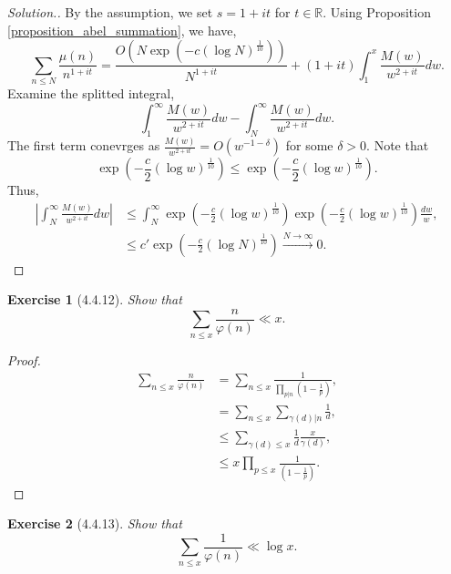 \documentclass{article}
\newtheorem{exercise}{Exercise}[section]
\newcommand{\R}[0]{\mathbb{R}}
\begin{document}
\begin{proof}[Solution.]
  By the assumption, we set $s = 1+it$ for $t\in\R$. Using Proposition \ref{proposition_abel_summation}, we have,
  \begin{equation*}
    \sum_{n\leq N}{\frac {\mu(n)} {n^{1+it}}} = {\frac {O(N\exp(-c(\log N)^{{\frac 1 {10}}}))} {N^{1+it}}}+(1+it)\int_1^x {\frac {M(w)} {w^{2+it}}}dw.
  \end{equation*}
  Examine the splitted integral,
  \begin{equation*}
    \int_1^\infty {\frac {M(w)} {w^{2+it}}}dw-\int_N^\infty {\frac {M(w)} {w^{2+it}}}dw.
  \end{equation*}
  The first term conevrges as ${\frac {M(w)} {w^{2+it}}}=O(w^{-1-\delta})$ for some $\delta>0$. Note that 
  \begin{equation*}
    \exp\left(-{\frac c 2}(\log w)^{{\frac 1 {10}}}\right)\leq \exp\left(-{\frac c 2}(\log w)^{{\frac 1 {10}}}\right).
  \end{equation*}
  Thus,
  \begin{align*}
    \left\vert\int_N^\infty {\frac {M(w)} {w^{2+it}}}dw\right\vert & \leq \int_N^\infty\exp\left(-{\frac c 2}(\log w)^{{\frac 1 {10}}}\right)\exp\left(-{\frac c 2}(\log w)^{{\frac 1 {10}}}\right){\frac {dw} w},\\
    & \leq c'\exp\left(-{\frac c 2}(\log N)^{{\frac 1 {10}}}\right)\stackrel{N\to\infty}{\to}0.
  \end{align*}
\end{proof}
\begin{exercise}[4.4.12]
  Show that 
  \begin{equation*}
    \sum_{n\leq x}{\frac n {\varphi(n)}}\ll x.
  \end{equation*}
\end{exercise}
\begin{proof}
  \begin{align*}
    \sum_{n\leq x}{\frac n {\varphi(n)}} & = \sum_{n\leq x}{\frac 1 {\prod_{p|n}\left(1-{\frac 1 p}\right)}},\\
    & = \sum_{n\leq x}\sum_{\gamma(d)|n}{\frac 1 d},\\
    & \leq \sum_{\gamma(d)\leq x}{\frac 1 d}{\frac {x} {\gamma(d)}},\\
    & \leq x\prod_{p\leq x}{\frac 1 {\left(1-{\frac 1 p}\right)}}.
  \end{align*}
\end{proof}
\begin{exercise}[4.4.13]
  \label{exercise_4.4.13}
  Show that 
  \begin{equation*}
    \sum_{n\leq x}{\frac 1 {\varphi(n)}}\ll \log x.
  \end{equation*}
\end{exercise}
\end{document}
